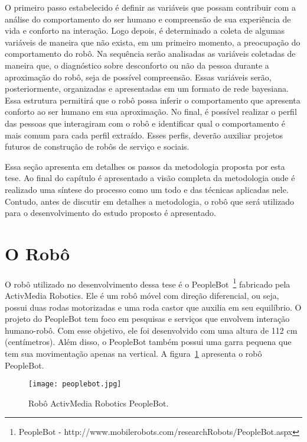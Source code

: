 O primeiro passo estabelecido é definir as variáveis que possam contribuir com a análise do comportamento do ser humano e compreensão de sua experiência de vida e conforto na interação. Logo depois, é determinado a coleta de algumas variáveis de maneira que não exista, em um primeiro momento, a preocupação do comportamento do robô. Na sequência serão analisadas as variáveis coletadas de maneira que, o diagnóstico sobre desconforto ou não da pessoa durante a aproximação do robô, seja de possível compreensão. Essas variáveis serão, posteriormente, organizadas e apresentadas em um formato de rede bayesiana. Essa estrutura permitirá que o robô possa inferir o comportamento que apresenta conforto ao ser humano em sua aproximação. No final, é possível realizar o perfil das pessoas que interagiram com o robô e identificar qual o comportamento é mais comum para cada perfil extraído. Esses perfis, deverão auxiliar projetos futuros de construção de robôs de serviço e sociais.

Essa seção apresenta em detalhes os passos da metodologia proposta por esta tese. Ao final do capítulo é apresentado a visão completa da metodologia onde é realizado uma síntese do processo como um todo e das técnicas aplicadas nele. Contudo, antes de discutir em detalhes a metodologia, o robô que será utilizado para o desenvolvimento do estudo proposto é apresentado.

\section{O Robô}
\label{sec:robo}
O robô utilizado no desenvolvimento dessa tese é o PeopleBot~\footnote{PeopleBot - http://www.mobilerobots.com/researchRobots/PeopleBot.aspx} fabricado pela ActivMedia Robotics. Ele é um robô móvel com direção diferencial, ou seja, possui duas rodas motorizadas e uma roda castor que auxilia em seu equilíbrio. O projeto do PeopleBot tem foco em pesquisas e serviços que envolvem interação humano-robô. Com esse objetivo, ele foi desenvolvido com uma altura de 112 cm (centímetros). Além disso, o PeopleBot também possui uma garra pequena que tem sua movimentação apenas na vertical. A figura~\ref{fig:peoplebot} apresenta o robô PeopleBot.

\begin{figure}[ht!]
	\centering
	\begin{minipage}{\textwidth}
		\caption{Robô ActivMedia Robotics PeopleBot.}
		\texttt{[image: peoplebot.jpg]}
		\label{fig:peoplebot}
	\end{minipage}
\end{figure}

